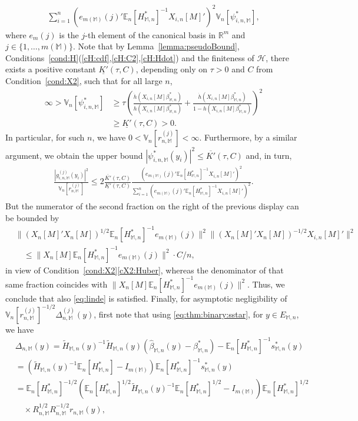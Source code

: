 \documentclass[preprint]{imsart}
\newcommand{\R}{{\mathbb R}}
\newcommand{\E}{{\mathbb E}}
\newcommand{\V}{{\mathbb V}}
\newcommand{\M}{\mathbb M}
\numberwithin{equation}{section}
\begin{document}
\begin{align*}
\sum_{i=1}^n \left(e_{m(\M)}(j)'\E_n[H_{\M,n}^*]^{-1}X_{i,n}[M]'\right)^2 \V_n[\psi_{i,n,\M}^*],
\end{align*}
where $e_m(j)$ is the $j$-th element of the canonical basis in $\R^m$ and $j\in\{1,\dots, m(\M)\}$. Note that by Lemma~\ref{lemma:pseudoBound}, Conditions~\ref{cond:H}(\ref{cH:cdf},\ref{cH:C2},\ref{cH:Hdot}) and the finiteness of $\mathcal H$, there exists a positive constant $\underline{K'}(\tau, C)$, depending only on $\tau>0$ and $C$ from Condition~\ref{cond:X2}, such that for all large $n$,
\begin{align*}
\infty > \V_n[\psi_{i,n,\M}^*]
&\ge \tau \left(\frac{\dot{h}(X_{i,n}[M]\beta_{\M,n}^*)}{h(X_{i,n}[M]\beta_{\M,n}^*)} + \frac{\dot{h}(X_{i,n}[M]\beta_{\M,n}^*)}{1-h(X_{i,n}[M]\beta_{\M,n}^*)}\right)^2\\
&\ge \underline{K'}(\tau, C) > 0.
\end{align*}
In particular, for such $n$, we have $0 < \V_n[r_{n,\M}^{(j)}] < \infty$. Furthermore, by a similar argument, we obtain the upper bound $|\psi_{i,n,\M}^*(y_i)|^2\le \overline{K'}(\tau, C)$ and, in turn,
\begin{align}\label{eq:thm:binary:bound}
\frac{|g_{i,n,\M}^{(j)}(y_i)|^2}{\V_n[r_{n,\M}^{(j)}]} \le 
2\frac{\overline{K'}(\tau, C)}{\underline{K'}(\tau, C)} 
	\frac{ \left( e_{m(\M)}(j)'\E_n[H_{\M,n}^*]^{-1}X_{i,n}[M]'\right)^2}{\sum_{i=1}^n \left(e_{m(\M)}(j)'\E_n[H_{\M,n}^*]^{-1}X_{i,n}[M]'\right)^2}.
\end{align}
But the numerator of the second fraction on the right of the previous display can be bounded by 
\begin{align*}
&\|(X_n[M]'X_n[M])^{1/2}\E_n[H_{\M,n}^*]^{-1}e_{m(\M)}(j)\|^2  \|(X_n[M]'X_n[M])^{-1/2}X_{i,n}[M]'\|^2\\
&\quad\le
\|X_n[M]\E_n[H_{\M,n}^*]^{-1}e_{m(\M)}(j)\|^2 \cdot C/n,
\end{align*}
in view of Condition~\ref{cond:X2}\eqref{cX2:Huber}, whereas the denominator of that same fraction coincides with $\|X_n[M]\E_n[H_{\M,n}^*]^{-1}e_{m(\M)}(j)\|^2$. Thus, we conclude that also \eqref{eq:linde} is satisfied. Finally, for asymptotic negligibility of $\V_n[r_{n,\M}^{(j)}]^{-1/2}\Delta_{n,\M}^{(j)}(y)$, first note that using \eqref{eq:thm:binary:sstar}, for $y\in E_{\M,n}$, we have
\begin{align*}
&\Delta_{n,\M}(y) = \tilde{H}_{\M,n}(y)^{-1}\tilde{H}_{\M,n}(y)(\hat{\beta}_{\M,n}(y) - \beta_{\M,n}^*) - \E_n[H_{\M,n}^*]^{-1}s_{\M,n}^*(y) \\
&=
\left(\tilde{H}_{\M,n}(y)^{-1}\E_n[H_{\M,n}^*] - I_{m(\M)} \right)\E_n[H_{\M,n}^*]^{-1}s_{\M,n}^*(y)\\
&= \E_n[H_{\M,n}^*]^{-1/2}\left(\E_n[H_{\M,n}^*]^{1/2}\tilde{H}_{\M,n}(y)^{-1}\E_n[H_{\M,n}^*]^{1/2} - I_{m(\M)} \right) \E_n[H_{\M,n}^*]^{1/2}\\
&\quad\times R_{n,\M}^{1/2} R_{n,\M}^{-1/2}r_{n,\M}(y),
\end{align*}
\end{document}
